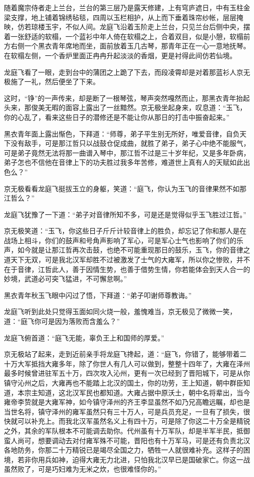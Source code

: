 随着魔宗侍者走上兰台，兰台的第三层乃是露天修建，上有穹庐遮日，中有玉柱金梁支撑，地上铺着锦绣毡毯，四周以玉栏相护，从上而下垂着珠帘纱帐，层层掩映，仿若琼楼玉宇，不似人间。龙庭飞沿着玉阶走上兰台，只见兰台后侧中央，摆着一张舒适的软榻，一个蓝衫中年人倚在软榻之上，合着双目，似是小憩，软榻前方右侧一个黑衣青年席地而坐，面前放着玉几古琴，那青年正在一心一意地抚琴。在软榻左侧，一个香炉里面正冉冉升起淡淡的香烟，更是衬得此间仿若仙境。

龙庭飞看了一眼，走到台中的蒲团之上跪了下去，而段凌霄却是对着那蓝衫人京无极施了一礼，然后便坐了下来。

这时，“铮”的一声传来，却是断了一根琴弦，琴声突然嘎然而止，那黑衣青年抬起头来，那俊美无暇的面容上露出了一丝黯然。京无极坐起身来，叹息道：“玉飞，你的心乱了，看来这些日子的潜修还是不能让你从那日的打击中振奋起来。”

黑衣青年面上露出惭色，下拜道：“师尊，弟子平生别无所好，唯爱音律，自负天下没有敌手，可是那江哲只以战鼓仓促成曲，就胜了弟子，弟子心中绝不能服气，可是弟子竟然无法将那一曲谱入琴中，那江哲不过是三十岁年纪，又是多年卧病，弟子怎也不信他在音律上下的功夫胜过我多年苦修，难道世上真有人的天赋如此出色么？”

京无极看看龙庭飞挺拔玉立的身躯，笑道：“庭飞，你认为玉飞的音律果然不如那江哲么？”

龙庭飞犹豫了一下道：“弟子对音律所知不多，可是还是觉得似乎玉飞胜过江哲。”

京无极笑道：“玉飞，你这些日子斤斤计较音律上的胜负，却忘记了你和那人是在战场上相斗，你们的鼓声和号角声影响了军心，可是军心士气也影响了你们的乐声，如今就是让那江哲再次击鼓，也绝不可能重现那日的鼓乐，玉飞，你的音律之道天下无双，可是我北汉军却胜不过被激发了士气的大雍军，所以你之惨败，并不在于音律，江哲此人，善于因情生势，也善于借势生情，你若能体会到天人合一的妙境，武道必可突飞猛进，不可懈怠啊。”

黑衣青年秋玉飞眼中闪过了悟，下拜道：“弟子叩谢师尊教诲。”

龙庭飞听到此处只觉得玉面如同火烧一般，羞愧难当，京无极见了微微一笑，道：“庭飞你可是因为落败而含羞么？”

龙庭飞俯首道：“庭飞无能，辜负王上和国师的厚爱。”

京无极站了起来，走到近前亲手将龙庭飞搀起，道：“庭飞，你错了，能够带着二十万大军抵挡大雍多年，除了你世人有几人可以做到，整整十四年了，大雍在泽州最多时候曾进驻军五十万，四次攻入沁州，更有一次已经到了晋阳城下，可是从你镇守沁州之后，大雍再也不能踏上北汉的国土，你的功劳，王上知道，朝中群臣知道，本宗主知道，这北汉军民也都知道。大雍占据中原沃土，朝中名将辈出，当今雍帝李贽就是大雍军神，如今镇守泽州的齐王李显虽然不如乃兄高瞻远瞩，却也是当世名将，镇守泽州的雍军虽然只有三十万人，可是兵员充足，一旦有了损失，很快就可以补充上。而我北汉军虽然名义上有四十万，可是除了你这二十万全是精锐之外，其余的军队根本不可能调去助你。代州虽有十万军队，却是半军半民，抵御蛮人尚可，想要调动去对付雍军殊不可能，晋阳也有十万军马，可是还有负责北汉各地防务，你那二十万精锐已是竭尽全国之力，牺牲一人就很难补充。这样子的困境，若非你用兵如神，迫得大雍无力北进，只怕我北汉早已是国破家亡。你这一战虽然败了，可是巧妇难为无米之炊，也很难怪你的。”

